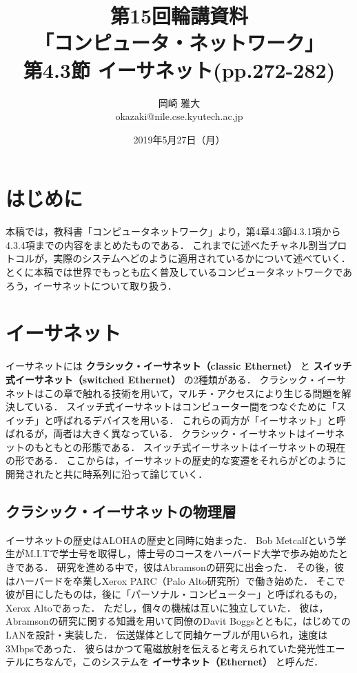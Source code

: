 \documentclass[a4paper]{ltjsarticle}
\title{第15回輪講資料\\
「コンピュータ・ネットワーク」\\
第4.3節 イーサネット(pp.272-282)}
\author{岡崎 雅大 \\
okazaki@nile.cse.kyutech.ac.jp}
\date{2019年5月27日（月）}
\begin{document}
\maketitle
\tableofcontents

\section{はじめに}\label{ux306fux3058ux3081ux306b}

本稿では，教科書「コンピュータネットワーク」より，第4章4.3節4.3.1項から4.3.4項までの内容をまとめたものである．
これまでに述べたチャネル割当プロトコルが，実際のシステムへどのように適用されているかについて述べていく．
とくに本稿では世界でもっとも広く普及しているコンピュータネットワークであろう，イーサネットについて取り扱う．

\section{イーサネット}\label{ux30a4ux30fcux30b5ux30cdux30c3ux30c8}

イーサネットには \textbf{クラシック・イーサネット（classic Ethernet）}
と \textbf{スイッチ式イーサネット（switched Ethernet）} の2種類がある．
クラシック・イーサネットはこの章で触れる技術を用いて，マルチ・アクセスにより生じる問題を解決している．
スイッチ式イーサネットはコンピューター間をつなぐために「スイッチ」と呼ばれるデバイスを用いる．
これらの両方が「イーサネット」と呼ばれるが，両者は大きく異なっている．
クラシック・イーサネットはイーサネットのもともとの形態である．
スイッチ式イーサネットはイーサネットの現在の形である．
ここからは，イーサネットの歴史的な変遷をそれらがどのように開発されたと共に時系列に沿って論じていく．

\subsection{クラシック・イーサネットの物理層}\label{ux30afux30e9ux30b7ux30c3ux30afux30a4ux30fcux30b5ux30cdux30c3ux30c8ux306eux7269ux7406ux5c64}

イーサネットの歴史はALOHAの歴史と同時に始まった． Bob
Metcalfという学生がM.I.Tで学士号を取得し，博士号のコースをハーバード大学で歩み始めたときである．
研究を進める中で，彼はAbramsonの研究に出会った．
その後，彼はハーバードを卒業しXerox PARC（Palo
Alto研究所）で働き始めた．
そこで彼が目にしたものは，後に「パーソナル・コンピューター」と呼ばれるもの，Xerox
Altoであった． ただし，個々の機械は互いに独立していた．
彼は，Abramsonの研究に関する知識を用いて同僚のDavit
Boggsとともに，はじめてのLANを設計・実装した．
伝送媒体として同軸ケーブルが用いられ，速度は3Mbpsであった．
彼らはかつて電磁放射を伝えると考えられていた発光性エーテルにちなんで，このシステムを
\textbf{イーサネット（Ethernet）} と呼んだ．
\end{document}
